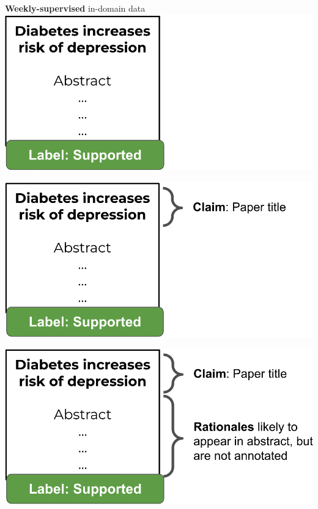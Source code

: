 \documentclass[13.5pt,aspecratio=169, xcolor=dvipsnames]{beamer}
\begin{document}
\begin{frame}
\begin{minipage}[t]{0.54\textwidth}
{{            }

             {
                \centering
                \textbf{Weekly-supervised} in-domain data
                \phantom{                fdjjnf
                }
            }
             {
                \includegraphics[width=\textwidth]{Stage_1_data_0.png}
            }

             {
                \includegraphics[width=\textwidth]{Stage_1_data_1.png}
            }

             {
                \includegraphics[width=\textwidth]{Stage_1_data_2.png}
            }

}
\end{minipage}
\end{frame}
\end{document}
